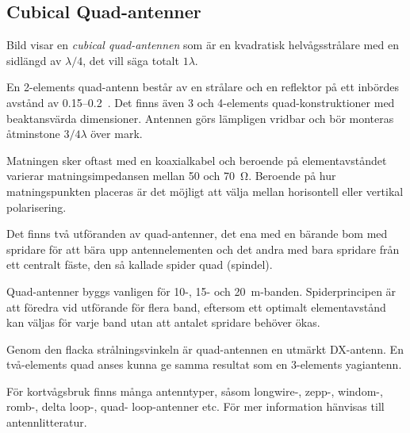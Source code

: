 \subsection{Cubical Quad-antenner}


Bild  visar en \emph{cubical quad-antennen} som är en
kvadratisk helvågsstrålare med en sidlängd av \(\lambda/4\), det vill säga
totalt \(1 \lambda\).

En 2-elements quad-antenn består av en strålare och en reflektor på ett inbördes
avstånd av \numrange{0,15}{0,2}~\lambda.
Det finns även 3 och 4-elements quad-konstruktioner med beaktansvärda
dimensioner.
Antennen görs lämpligen vridbar och bör monteras åtminstone $3/4 \lambda$
över mark.

Matningen sker oftast med en koaxialkabel och beroende på elementavståndet
varierar matningsimpedansen mellan 50 och \SI{70}{\ohm}.
Beroende på hur matningspunkten placeras är det möjligt att välja mellan
horisontell eller vertikal polarisering.

Det finns två utföranden av quad-antenner, det ena med en bärande bom
med spridare för att bära upp antennelementen och det andra med bara
spridare från ett centralt fäste, den så kallade spider quad (spindel).

Quad-antenner byggs vanligen för 10-, 15- och \SI{20}{\metre}-banden.
Spiderprincipen är att föredra vid utförande för flera band, eftersom ett
optimalt element\-avstånd kan väljas för varje band utan att antalet spridare
behöver ökas.

Genom den flacka strålningsvinkeln är quad-\-an\-tennen en utmärkt DX-antenn.
En två-elements quad anses kunna ge samma resultat som en 3-elements yagiantenn.

För kortvågsbruk finns många antenntyper, såsom longwire-, zepp-,
windom-, romb-, delta loop-, quad- loop-antenner etc.
För mer information hänvisas till antennlitteratur.
